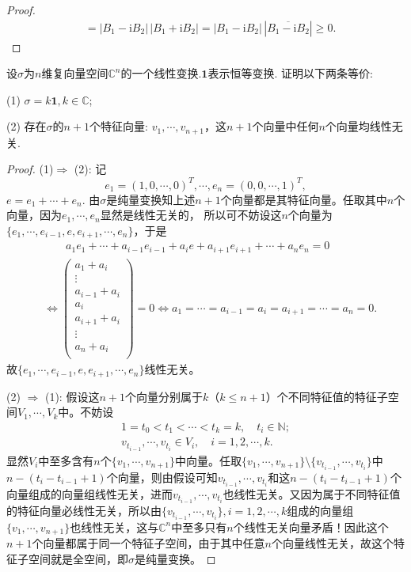 \documentclass[../../main.tex]{subfiles}%
\begin{document}
\begin{proof}
\begin{align*}
&= |B_1 - \text{i}B_2| \, |B_1 +  \text{i}B_2| = |B_1 - \text{i}B_2| \, |\overline{B_1 -  \text{i}B_2}| \geqslant 0.
\end{align*}
\end{proof}

\begin{example}
设\(\sigma\)为\(n\)维复向量空间\(\mathbb{C}^n\)的一个线性变换.\(\mathbf{1}\)表示恒等变换. 证明以下两条等价:

(1) \(\sigma = k\mathbf{1}, k \in \mathbb{C}\);

(2) 存在\(\sigma\)的\(n + 1\)个特征向量: \(v_1, \cdots, v_{n+1}\)，这\(n + 1\)个向量中任何\(n\)个向量均线性无关.
\end{example}
\begin{proof}
(1)$\Longrightarrow$ (2): 记
$$e_1=(1,0,\cdots,0)^T,\cdots,e_n=(0,0,\cdots,1)^T,$$
$e=e_1+\cdots+e_n$.
由$\sigma$是纯量变换知上述$n+1$个向量都是其特征向量。任取其中$n$个向量，因为$e_1,\cdots,e_n$显然是线性无关的，
所以可不妨设这$n$个向量为$\{e_1,\cdots,e_{i-1},e,e_{i+1},\cdots,e_n\}$，于是
\begin{align*}
&\quad \quad a_1e_1+\cdots +a_{i-1}e_{i-1}+a_ie+a_{i+1}e_{i+1}+\cdots +a_ne_n=0
\\
&\Longleftrightarrow \left( \begin{array}{c}
a_1+a_i\\
\vdots\\
a_{i-1}+a_i\\
a_i\\
a_{i+1}+a_i\\
\vdots\\
a_n+a_i\\
\end{array} \right) =0\Longleftrightarrow a_1=\cdots =a_{i-1}=a_i=a_{i+1}=\cdots =a_n=0.
\end{align*}
故$\{e_1,\cdots,e_{i-1},e,e_{i+1},\cdots,e_n\}$线性无关。

(2) $\Longrightarrow$ (1): 假设这$n+1$个向量分别属于$k$（$k\leqslant n+1$）个不同特征值的特征子空间$V_1,\cdots,V_k$中。不妨设
\begin{gather*}
1=t_0<t_1<\cdots<t_k=k,\quad t_i\in \mathbb{N};
\\
v_{t_{i-1}},\cdots,v_{t_i}\in V_i,\quad i=1,2,\cdots,k.
\end{gather*}
显然$V_i$中至多含有$n$个$\{v_1,\cdots,v_{n+1}\}$中向量。任取$\{v_1,\cdots,v_{n+1}\}\setminus\{v_{t_{i-1}},\cdots,v_{t_i}\}$中$n-(t_i-t_{i-1}+1)$个向量，则由假设可知$v_{t_{i-1}},\cdots,v_{t_i}$和这$n-(t_i-t_{i-1}+1)$个向量组成的向量组线性无关，进而$v_{t_{i-1}},\cdots,v_{t_i}$也线性无关。又因为属于不同特征值的特征向量必线性无关，所以由$\{v_{t_{i-1}},\cdots,v_{t_i}\},i=1,2,\cdots,k$组成的向量组$\{v_1,\cdots,v_{n+1}\}$也线性无关，这与$\mathbb{C}^n$中至多只有$n$个线性无关向量矛盾！因此这个$n+1$个向量都属于同一个特征子空间，由于其中任意$n$个向量线性无关，故这个特征子空间就是全空间，即$\sigma$是纯量变换。
\end{proof}
\end{document}
